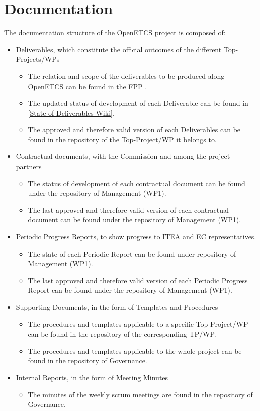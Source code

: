 \documentclass{template/openetcs_article}
\begin{document}
\section{Documentation}

The documentation structure of the OpenETCS project is composed of:
\begin{itemize}
\item Deliverables, which constitute the official outcomes of the different Top-Projects/\gls{WP}s
\begin{itemize}
\item The relation and scope of the deliverables to be produced along OpenETCS can be found in the FPP \citep{fpp}.
\item The updated status of development of each Deliverable can be found in 
\href{https://github.com/openETCS/management/wiki/State-of-Deliverables}{[State-of-Deliverables Wiki]}.
\item The approved and therefore valid version of each Deliverables can be found in the repository of the Top-Project/\gls{WP} it belongs to. 
\end{itemize}
\item Contractual documents, with the Commission and among the project partners
\begin{itemize}
\item The status of development of each contractual document can be found under the repository of Management (WP1).
\item The last approved and therefore valid version of each contractual document can be found under the repository of Management (WP1).
\end{itemize}
\item Periodic Progress Reports, to show progress to ITEA and EC representatives.
\begin{itemize}
\item The state of each Periodic Report can be found under repository of Management (WP1).
\item The last approved and therefore valid version of each Periodic Progress Report can be found under the repository of Management (WP1). 
\end{itemize}
\item Supporting Documents, in the form of Templates and Procedures
\begin{itemize}
\item The procedures and templates applicable to a specific Top-Project/\gls{WP} can be found in the repository of the corresponding TP/\gls{WP}.
\item The procedures and templates applicable to the whole project can be found in the repository of Governance.
\end{itemize}
\item Internal Reports, in the form of Meeting Minutes
\begin{itemize}
\item The minutes of the weekly scrum meetings are found in the repository of Governance.
\end{itemize}
\end{itemize}
\end{document}
